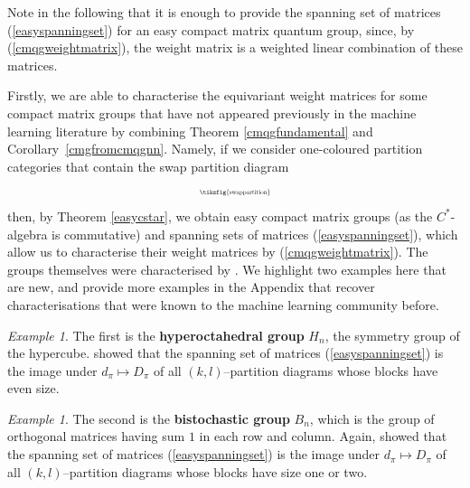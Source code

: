 \documentclass{article}
\theoremstyle{plain}
\theoremstyle{definition}
\theoremstyle{remark}
\newtheorem{example}[theorem]{Example}
\begin{document}
Note in the following that it is enough to provide the spanning set of matrices
(\ref{easyspanningset}) for an easy compact matrix quantum group, since, 
by (\ref{cmqgweightmatrix}), 
the weight matrix is a weighted linear combination of these
matrices.

Firstly, we are able to characterise the equivariant weight matrices 
for some compact matrix groups
that have not appeared previously in the machine learning literature by
combining Theorem \ref{cmqgfundamental}
and Corollary~\ref{cmgfromcmqgnn}. 
Namely, if we consider one-coloured partition categories
that contain the swap partition diagram 
	\begin{equation} \label{swappart}
		\begin{aligned}
			\scalebox{0.5}{\tikzfig{swappartition}}
		\end{aligned}
	\end{equation}
	then, by Theorem \ref{easycstar},
we obtain easy compact matrix groups (as the $C^*$-algebra is commutative) 
and spanning sets of matrices (\ref{easyspanningset}), which allow us to
characterise their weight matrices by (\ref{cmqgweightmatrix}).
The groups themselves were characterised by \citet{banica}.
We highlight two examples here that are new, and provide
more examples in the Appendix that recover characterisations 
that were known to the machine learning
community before. 
\begin{example}
	The first is the \textbf{hyperoctahedral group} $H_n$, the symmetry group
	of the hypercube. \citet{banica} showed that the spanning set of matrices
	(\ref{easyspanningset}) is the image under $d_\pi \mapsto D_\pi$ 
	of all $(k,l)$--partition diagrams whose blocks have even size.
\end{example}
\begin{example}
	The second is the \textbf{bistochastic group} $B_n$, 
	which is the group of orthogonal
	matrices having sum $1$ in each row and column. Again, 
	\citet{banica} showed that the spanning set of matrices
	(\ref{easyspanningset}) is the image under $d_\pi \mapsto D_\pi$ 
	of all $(k,l)$--partition diagrams whose
	blocks have size one or two.
\end{example}
\end{document}
